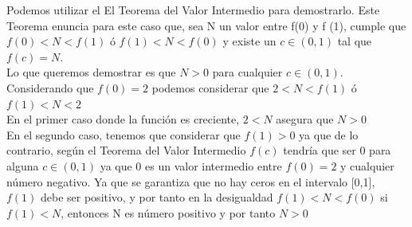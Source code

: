 \documentclass[12pt]{article}
\begin{document}
Podemos utilizar el El Teorema del Valor Intermedio para demostrarlo. Este Teorema enuncia para este caso que, sea N un valor entre f(0) y f (1), cumple que $f(0)<N<f(1)$ ó $f(1)<N<f(0)$ y existe un $c \in (0, 1)$ tal que $f(c) = N$.\\
Lo que queremos demostrar es que $N>0$ para cualquier $c \in (0, 1)$. \\
Considerando que $f(0) = 2 $ podemos considerar que $2<N<f(1)$ ó $f(1)<N<2$  \\
En el primer caso donde la función es creciente, $2<N$ asegura que $N>0$ \\
En el segundo caso, tenemos que considerar que $f(1)>0$ ya que de lo contrario, según el Teorema del Valor Intermedio $f(c)$ tendría que ser $0$ para alguna $c \in (0, 1)$ ya que 0 es un valor intermedio entre $f(0) = 2$ y cualquier número negativo. Ya que se garantiza que no hay ceros en el intervalo [0,1], $f(1)$ debe ser positivo, y por tanto en la desigualdad  $f(1)<N<f(0)$ si $f(1)<N$, entonces N es número positivo y por tanto $N>0$
\end{document}
